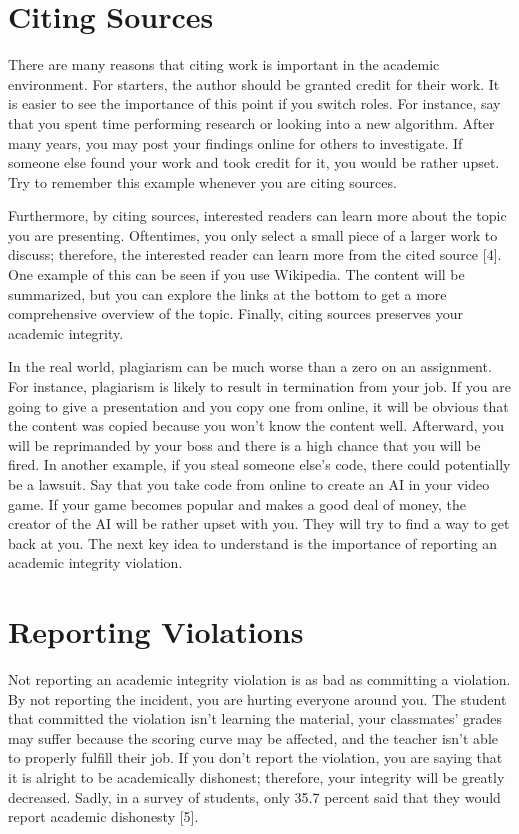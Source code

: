 \documentclass[11pt]{article}
\begin{document}
\section{Citing Sources}
There are many reasons that citing work is important in the academic environment. For starters, the author should be granted credit for their work. It is easier to see the importance of this point if you switch roles. For instance, say that you spent time performing research or looking into a new algorithm. After many years, you may post your findings online for others to investigate. If someone else found your work and took credit for it, you would be rather upset. Try to remember this example whenever you are citing sources.  

Furthermore, by citing sources, interested readers can learn more about the topic you are presenting. Oftentimes, you only select a small piece of a larger work to discuss; therefore, the interested reader can learn more from the cited source [4]. One example of this can be seen if you use Wikipedia. The content will be summarized, but you can explore the links at the bottom to get a more comprehensive overview of the topic. Finally, citing sources preserves your academic integrity.  

In the real world, plagiarism can be much worse than a zero on an assignment. For instance, plagiarism is likely to result in termination from your job. If you are going to give a presentation and you copy one from online, it will be obvious that the content was copied because you won’t know the content well. Afterward, you will be reprimanded by your boss and there is a high chance that you will be fired. In another example, if you steal someone else’s code, there could potentially be a lawsuit. Say that you take code from online to create an AI in your video game. If your game becomes popular and makes a good deal of money, the creator of the AI will be rather upset with you. They will try to find a way to get back at you. The next key idea to understand is the importance of reporting an academic integrity violation. 

\section{Reporting Violations}
Not reporting an academic integrity violation is as bad as committing a violation. By not reporting the incident, you are hurting everyone around you. The student that committed the violation isn’t learning the material, your classmates' grades may suffer because the scoring curve may be affected, and the teacher isn’t able to properly fulfill their job. If you don’t report the violation, you are saying that it is alright to be academically dishonest; therefore, your integrity will be greatly decreased. Sadly, in a survey of students, only 35.7 percent said that they would report academic dishonesty [5].  
\end{document}
